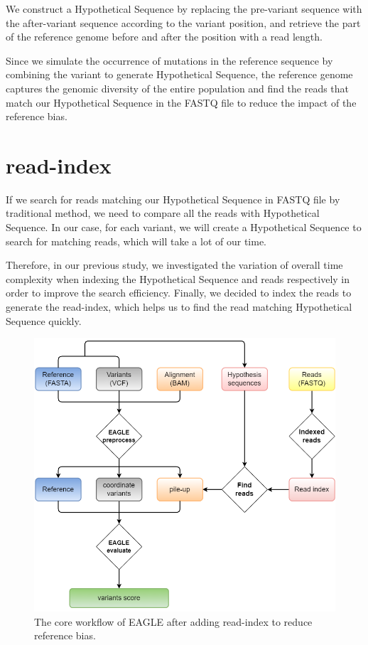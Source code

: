 \documentclass[PhD]{PHlab-thesis}
\begin{document}
We construct a Hypothetical Sequence by replacing the pre-variant sequence with the after-variant sequence according to the variant position, and retrieve the part of the reference genome before and after the position with a read length.

Since we simulate the occurrence of mutations in the reference sequence by combining the variant to generate Hypothetical Sequence, the reference genome captures the genomic diversity of the entire population and find the reads that match our Hypothetical Sequence in the FASTQ file to reduce the impact of the reference bias.
\section{read-index}
If we search for reads matching our Hypothetical Sequence in FASTQ file by traditional method, we need to compare all the reads with Hypothetical Sequence. In our case, for each variant, we will create a Hypothetical Sequence to search for matching reads, which will take a lot of our time.

Therefore, in our previous study, we investigated the variation of overall time complexity when indexing the Hypothetical Sequence and reads respectively in order to improve the search efficiency. Finally, we decided to index the reads to generate the read-index, which helps us to find the read matching Hypothetical Sequence quickly.
\\
\begin{figure}[h!]
	\centering
	\includegraphics[scale=0.7]{figures/EAGLE after.png}
	\caption{The core workflow of EAGLE after adding read-index to reduce reference bias.}
	\label{fig:EAGLE with read-index} %
\end{figure}
\end{document}
